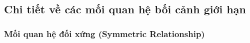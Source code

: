 \documentclass{report} %
\begin{document}
\subsection{Chi tiết về các mối quan hệ bối cảnh giới hạn}







 









\subsubsection{Mối quan hệ đối xứng (Symmetric Relationship)}

\end{document}
